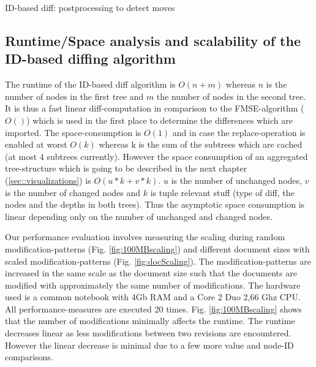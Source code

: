 \begin{algorithm}[Hhtbp]
\BlankLine
{}
\caption{ID-based diff: postprocessing to detect moves}\label{diffPostprocessing}
\end{algorithm}

\subsection{Runtime/Space analysis and scalability of the ID-based diffing algorithm}
The runtime of the ID-based diff algorithm is $O(n+m)$ whereas $n$ is the number of nodes in the first tree and $m$ the number of nodes in the second tree. It is thus a fast linear diff-computation in comparison to the FMSE-algorithm ($O()$) which is used in the first place to determine the differences which are imported. The space-consumption is $O(1)$ and in case the replace-operation is enabled at worst $O(k)$ whereas k is the sum of the subtrees which are cached (at most 4 subtrees currently). However the space consumption of an aggregated tree-structure which is going to be described in the next chapter (\ref{sec::visualizations}) is $O(u*k+v*k)$. $u$ is the number of unchanged nodes, $v$ is the number of changed nodes and $k$ is tuple relevant stuff (type of diff, the nodes and the depths in both trees). Thus the asymptotic space consumption is linear depending only on the number of unchanged and changed nodes.

Our performance evaluation involves measuring the scaling during random modification-patterns (Fig. \ref{fig:100MBscaling}) and different document sizes with scaled modification-patterns (Fig. \ref{fig:docScaling}). The modification-patterns are increased in the same scale as the document size such that the documents are modified with approximately the same number of modifications. The hardware used is a common notebook with 4Gb RAM and a Core 2 Duo 2,66 Ghz CPU. All performance-measures are executed 20 times. Fig. \ref{fig:100MBscaling} shows that the number of modifications minimally affects the runtime. The runtime decreases linear as less modifications between two revisions are encountered. However the linear decrease is minimal due to a few more value and node-ID comparisons.

